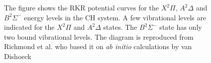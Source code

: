 \begin{figure}

\centering



\caption[Potential curves for the CH system]{The figure shows the RKR potential curves for the \(X^2\Pi\), \(A^2\Delta\) and \(B^2\Sigma^-\) energy levels in the CH system. A few vibrational levels are indicated for the \(X^2\Pi\) and \(A^2\Delta\) states. The \(B^2\Sigma^-\) state has only two bound vibrational levels. The diagram is reproduced from Richmond et al.\cite{2005-richmond} who based it on \emph{ab initio} calculations by van Dishoeck\cite{1987-vandishoeck}}

\label{fig:chRKR}

\end{figure}

